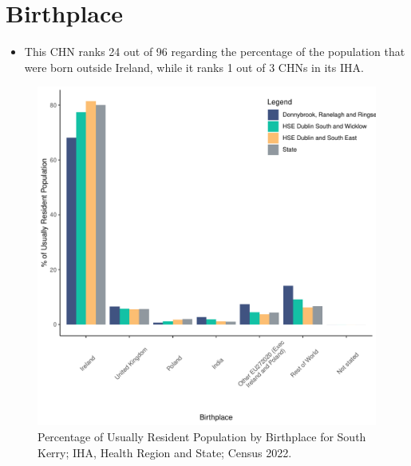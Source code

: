 \documentclass{article}
\begin{document}
\section{Birthplace}\label{sect:Birth}
\begin{itemize}
\item This CHN ranks  24 out of 96 regarding the percentage of the population that were born outside Ireland, while it ranks  1 out of 3 CHNs in its IHA.
\end{itemize}
\begin{figure}[H]
	\centering
	\includegraphics[width = 130mm]{../figures/BirthED.pdf}
	\caption{Percentage of Usually Resident Population by Birthplace for South Kerry; IHA, Health Region and State; Census 2022.}
	\label{fig:vbnv}
	\end{figure}
	
\end{document}
